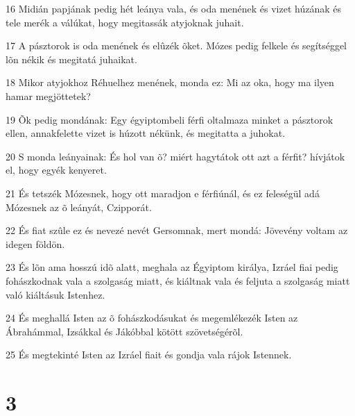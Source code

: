 \par 16 Midián papjának pedig hét leánya vala, és oda menének és vizet húzának és tele merék a válúkat, hogy megitassák atyjoknak juhait.
\par 17 A pásztorok is oda menének és elûzék õket. Mózes pedig felkele és segítséggel lõn nékik és megitatá juhaikat.
\par 18 Mikor atyjokhoz Réhuelhez menének, monda ez: Mi az oka, hogy ma ilyen hamar megjöttetek?
\par 19 Õk pedig mondának: Egy égyiptombeli férfi oltalmaza minket a pásztorok ellen, annakfelette vizet is húzott nékünk, és megitatta a juhokat.
\par 20 S monda leányainak: És hol van õ? miért hagytátok ott azt a férfit? hívjátok el, hogy egyék kenyeret.
\par 21 És tetszék Mózesnek, hogy ott maradjon e férfiúnál, és ez feleségül adá Mózesnek az õ leányát, Czipporát.
\par 22 És fiat szûle ez és nevezé nevét Gersomnak, mert mondá: Jövevény voltam az idegen földön.
\par 23 És lõn ama hosszú idõ alatt, meghala az Égyiptom királya, Izráel fiai pedig fohászkodnak vala a szolgaság miatt, és kiáltnak vala és feljuta a szolgaság miatt való kiáltásuk Istenhez.
\par 24 És meghallá Isten az õ fohászkodásukat és megemlékezék Isten az Ábrahámmal, Izsákkal és Jákóbbal kötött szövetségérõl.
\par 25 És megtekinté Isten az Izráel fiait és gondja vala rájok Istennek.

\chapter{3}

